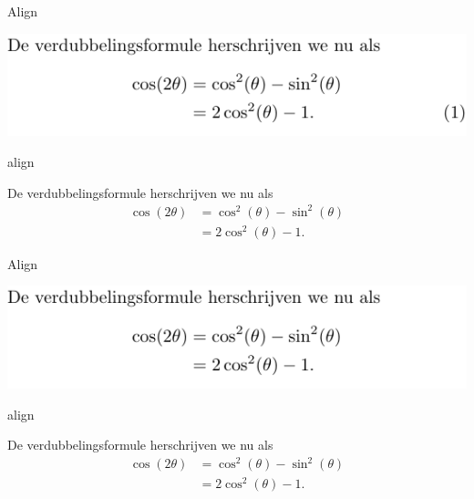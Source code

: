 \documentclass[presentatie.tex]{subfiles}
\begin{document}

\begin{frame}{Align}

	\includegraphics[width=\linewidth,height=0.4\textheight,keepaspectratio]{assets/5_Formules/mathAlignSecondNumbered.pdf}
\end{frame}


\begin{saveblock}{align}
	\begin{highlightblock}[gobble=8,linewidth=\textwidth,
		framexleftmargin=0.25em,xleftmargin=0.25em]
		De verdubbelingsformule herschrijven we nu als
		\begin{align*}
			\cos(2\theta) &= \cos^2(\theta) - \sin^2(\theta)\\
			&= 2\cos^2(\theta)-1.
		\end{align*}
	\end{highlightblock}
\end{saveblock}


\begin{frame}{Align}

	\includegraphics[width=\linewidth,height=0.4\textheight,keepaspectratio]{assets/5_Formules/mathAlignNoNumbers.pdf}
\end{frame}



\begin{saveblock}{align}
	\begin{highlightblock}[gobble=8,linewidth=\textwidth,
		framexleftmargin=0.25em,xleftmargin=0.25em]
		De verdubbelingsformule herschrijven we nu als
		\begin{align*}
			\cos(2\theta) &= \cos^2(\theta) - \sin^2(\theta)\\
			&= 2\cos^2(\theta)-1. \tag{$ * $}
		\end{align*}
	\end{highlightblock}
\end{saveblock}
\end{document}
